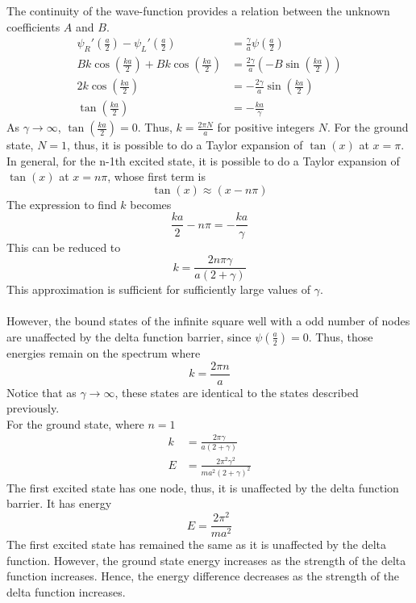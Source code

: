 \begin{sol}
The continuity of the wave-function provides a relation between the unknown coefficients $A$ and $B$. 
\begin{align}
    \psi_R'\left(\frac{a}{2}\right)-\psi_L'\left(\frac{a}{2}\right)&=\frac{\gamma}{a}\psi\left(\frac{a}{2}\right)\\
    Bk\cos\left(\frac{ka}{2}\right)+Bk\cos\left(\frac{ka}{2}\right)&=\frac{2\gamma}{a}\left(-B\sin\left(\frac{ka}{2}\right)\right)\\
    2k\cos\left(\frac{ka}{2}\right)&=-\frac{2\gamma}{a}\sin\left(\frac{ka}{2}\right)\\
    \tan\left(\frac{ka}{2}\right)&=-\frac{ka}{\gamma}
\end{align}
As $\gamma\to\infty$, $\tan(\frac{ka}{2})=0$. Thus, $k=\frac{2\pi N}{a}$ for positive integers $N$. For the ground state, $N=1$, thus, it is possible to do a Taylor expansion of $\tan(x)$ at $x=\pi$. In general, for the n-1th excited state, it is possible to do a Taylor expansion of $\tan(x)$ at $x=n\pi$, whose first term is
\begin{equation}
    \tan(x)\approx(x-n\pi)
\end{equation}
The expression to find $k$ becomes
\begin{equation}
    \frac{ka}{2}-n\pi=-\frac{ka}{\gamma}
\end{equation}
This can be reduced to
\begin{equation}
    k=\frac{2n\pi\gamma}{a(2+\gamma)}
\end{equation}
This approximation is sufficient for sufficiently large values of $\gamma$.\\
\\
However, the bound states of the infinite square well with a odd number of nodes are unaffected by the delta function barrier, since $\psi(\frac{a}{2})=0$. Thus, those energies remain on the spectrum where
\begin{equation}
    k=\frac{2\pi n}{a}
\end{equation}
Notice that as $\gamma\to\infty$, these states are identical to the states described previously.\\
For the ground state, where $n=1$
\begin{align}
    k&=\frac{2\pi\gamma}{a(2+\gamma)}\\
    E&=\frac{2\pi^2\gamma^2}{ma^2(2+\gamma)^2}
\end{align}
The first excited state has one node, thus, it is unaffected by the delta function barrier. It has energy
\begin{equation}
    E=\frac{2\pi^2}{ma^2}
\end{equation}
The first excited state has remained the same as it is unaffected by the delta function. However, the ground state energy increases as the strength of the delta function increases. Hence, the energy difference decreases as the strength of the delta function increases. 
\end{sol}